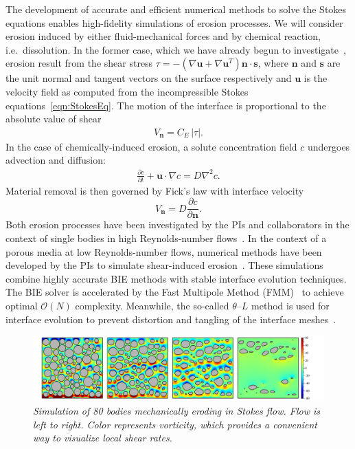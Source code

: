 \documentclass[11pt]{article}
\newcommand{\pd}[2]{ \frac{ \partial #1}{ \partial #2 } }
\newcommand{\bvec}[1]{{\mathbf{#1}}}
\newcommand{\grad}{\nabla}
\newcommand {\Lap} {\grad^2}
\newcommand{\abs}[1]{\left| #1 \right|}
\newcommand{\uu}{\bvec{u}}
\newcommand{\nn}{{\mathbf{n}}}
\renewcommand{\ss}{{\mathbf{s}}}
\newcommand{\Vn}{V_\nn}
\newcommand{\CE}{C_E}
\newcommand {\ny}{\mathbf{n}}
\newcommand{\Diff}{D}
\newcommand{\thL}{$\theta$--$L$}
\begin{document}
The development of accurate and efficient numerical methods to solve the Stokes equations enables high-fidelity simulations of erosion processes. We will consider erosion induced by either fluid-mechanical forces and by chemical reaction, i.e.~dissolution. In the former case, which we have already begun to investigate~\cite{Quaife2018}, erosion result from the shear stress $\tau = -\left(\nabla \uu + \nabla \uu^T \right)\nn \cdot \ss$, where $\nn$ and $\ss$ are the unit normal and tangent vectors on the surface respectively and $\uu$ is the velocity field as computed from the incompressible Stokes equations~\eqref{eqn:StokesEq}. The motion of the interface is proportional to the absolute value of shear 
\begin{align}
  \Vn = \CE \, \abs{\tau}.
\end{align}
In the case of chemically-induced erosion, a solute concentration field $c$ undergoes advection and diffusion:
\begin{align}
  \label{Ceq}
  \pd{c}{t} + \uu \cdot \grad c = \Diff \Lap c.
\end{align}
Material removal is then governed by Fick's law with interface velocity
\begin{equation}
\label{DissVn}
\Vn = \Diff \pd{c}{\ny}.
\end{equation}
Both erosion processes have been investigated by the PIs and collaborators in the context of single bodies in high Reynolds-number flows~\cite{Ristroph2012, MoorePOF2013, HuangJFM2015, MooreCPAM2017}. In the context of a porous media at low Reynolds-number flows, numerical methods have been developed by the PIs to simulate shear-induced erosion~\cite{Quaife2018, chi-moo-qua2019}. These simulations combine highly accurate BIE methods with stable interface evolution techniques.  The BIE solver is accelerated by the Fast Multipole Method (FMM)~\cite{gre-rok1987, gre-gre-may1992} to achieve optimal $\mathcal{O}(N)$ complexity. Meanwhile, the so-called {\thL} method is used for interface evolution to prevent distortion and tangling of the interface meshes~\cite{hou1994removing, MoorePOF2013, Quaife2018}.

\begin{figure}%
\begin{center}
\includegraphics[width = 0.99 \textwidth]{./figs/80circ8vort.pdf}
\caption{\label{80circ8vort} \em Simulation of 80 bodies mechanically eroding in Stokes flow. Flow is left to right. Color represents vorticity, which provides a convenient way to visualize local shear rates. 
}
\end{center}
\end{figure}
 
\end{document}
